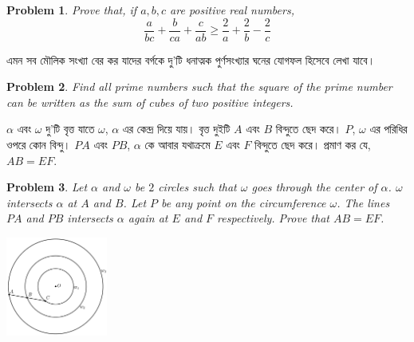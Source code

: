 \documentclass[a4paper, 10pt]{article}
\newtheorem{eproblem}{Problem}
\begin{document}
\begin{eproblem}
Prove that, if $a,b,c$ are positive real numbers,
$$\dfrac{a}{bc}+\dfrac{b}{ca}+\dfrac{c}{ab}\ge \dfrac{2}{a}+\dfrac{2}{b}-\dfrac{2}{c}$$
\end{eproblem}

\begin{problem}
এমন সব মৌলিক সংখ্যা বের কর যাদের বর্গকে দু'টি ধনাত্মক পুর্ণসংখ্যার ঘনের যোগফল হিসেবে লেখা যাবে।
\end{problem}

\begin{eproblem}
Find all prime numbers such that the square of the prime number can be written as the sum of cubes of two positive integers.
\end{eproblem}

\begin{problem}
$\alpha$ এবং $\omega$ দু'টি বৃত্ত যাতে $\omega$, $\alpha$ এর কেন্দ্র দিয়ে যায়। বৃত্ত দুইটি $A$ এবং $B$ বিন্দুতে ছেদ করে। $P$, $\omega$ এর পরিধির ওপরে কোন বিন্দু। $PA$ এবং $PB$, $\alpha$ কে আবার যথাক্রমে $E$ এবং $F$ বিন্দুতে ছেদ করে। প্রমাণ কর যে, $AB=EF$.
\end{problem}

\begin{eproblem}
Let $\alpha$ and $\omega$ be $2$ circles such that $\omega$ goes through the center of $\alpha$. $\omega$ intersects $\alpha$ at  $A$ and $B$. Let $P$ be any point on the circumference $\omega$. The lines $PA$ and $PB$ intersects $\alpha$ again at $E$ and $F$ respectively. Prove that $AB=EF$.
\end{eproblem}

\begin{center}
\includegraphics[width=0.25\textwidth]{geo}
\end{center}
\end{document}
